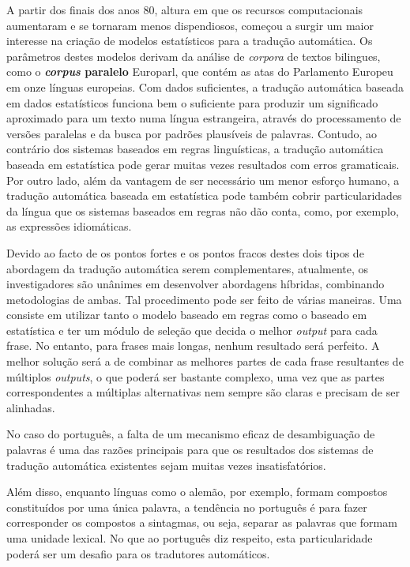 \begin{multicols}{2}
A partir dos finais dos anos 80, altura em que os recursos computacionais aumentaram e se tornaram menos dispendiosos, começou a surgir um maior interesse na criação de modelos estatísticos para a tradução automática. Os parâmetros destes modelos derivam da análise de \textit{corpora} de textos bilingues, como o \textbf{\textit{corpus} paralelo} Europarl, que contém as atas do Parlamento Europeu em onze línguas europeias. Com dados suficientes, a tradução automática baseada em dados estatísticos funciona bem o suficiente para produzir um significado aproximado para um texto numa língua estrangeira, através do processamento de versões paralelas e da busca por padrões plausíveis de palavras. Contudo, ao contrário dos sistemas baseados em regras linguísticas, a tradução automática baseada em estatística pode gerar muitas vezes resultados com erros gramaticais. Por outro lado, além da vantagem de ser necessário um menor esforço humano, a tradução automática baseada em estatística pode também cobrir particularidades da língua que os sistemas baseados em regras não dão conta, como, por exemplo, as expressões idiomáticas.

Devido ao facto de os pontos fortes e os pontos fracos destes dois tipos de abordagem da tradução automática serem complementares, atualmente, os investigadores são unânimes em desenvolver abordagens híbridas, combinando metodologias de ambas. Tal procedimento pode ser feito de várias maneiras. Uma consiste em utilizar tanto o modelo baseado em regras como o baseado em estatística e ter um módulo de seleção que decida o melhor \textit{output} para cada frase. No entanto, para frases mais longas, nenhum resultado será perfeito. A melhor solução será a de combinar as melhores partes de cada frase resultantes de múltiplos \textit{outputs}, o que poderá ser bastante complexo, uma vez que as partes cor\-res\-pon\-den\-tes a múltiplas alternativas nem sempre são claras e precisam de ser alinhadas.

No caso do português, a falta de um mecanismo eficaz de desambiguação de palavras é uma das razões principais para que os resultados dos sistemas de tradução automática existentes sejam muitas vezes insatisfatórios.

Além disso, enquanto línguas como o alemão, por exemplo, formam compostos constituídos por uma única palavra, a tendência no português é para fazer corresponder os compostos a sintagmas, ou seja, separar as palavras que formam uma unidade lexical. No que ao português diz respeito, esta particularidade poderá ser um desafio para os tradutores automáticos.


\end{multicols}
